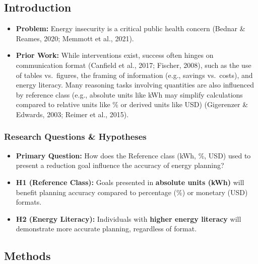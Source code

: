 \documentclass[
  12pt,
]{article}
\providecommand{\tightlist}{%
  \setlength{\itemsep}{0pt}\setlength{\parskip}{0pt}}
\begin{document}
\begin{multicols}{3}
\raggedright %

\subsection{Introduction}\label{introduction}

\begin{itemize}
\tightlist
\item
  \textbf{Problem:} Energy insecurity is a critical public health
  concern (Bednar \& Reames, 2020; Memmott et al., 2021).
\item
  \textbf{Prior Work:} While interventions exist, success often hinges
  on communication format (Canfield et al., 2017; Fischer, 2008), such
  as the use of tables vs.~figures, the framing of information (e.g.,
  savings vs.~costs), and energy literacy. Many reasoning tasks
  involving quantities are also influenced by reference class (e.g.,
  absolute units like kWh may simplify calculations compared to relative
  units like \% or derived units like USD) (Gigerenzer \& Edwards, 2003;
  Reimer et al., 2015).
\end{itemize}

\subsubsection{Research Questions \&
Hypotheses}\label{research-questions-hypotheses}

\begin{itemize}
\tightlist
\item
  \textbf{Primary Question:} How does the Reference class (kWh, \%, USD)
  used to present a reduction goal influence the accuracy of energy
  planning?
\item
  \textbf{H1 (Reference Class):} Goals presented in \textbf{absolute
  units (kWh)} will benefit planning accuracy compared to percentage
  (\%) or monetary (USD) formats.
\item
  \textbf{H2 (Energy Literacy):} Individuals with \textbf{higher energy
  literacy} will demonstrate more accurate planning, regardless of
  format.
\end{itemize}

\subsection{Methods}\label{methods}


\end{multicols}
\end{document}
